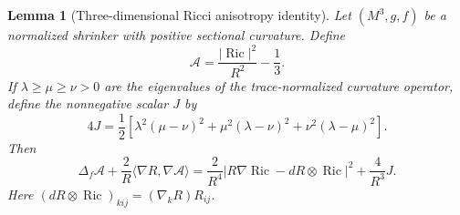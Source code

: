 \documentclass[10pt]{coll-l}
\newtheorem{lemma}[theorem]{Lemma}
\theoremstyle{definition}
\theoremstyle{remark}
\numberwithin{section}{chapter}
\numberwithin{equation}{chapter}
\newcommand{\Ric}{\operatorname{Ric}}
\begin{document}
\begin{lemma}[Three-dimensional Ricci anisotropy identity]
\label{lem:three-shrinker-anisotropy-identity}
Let $(M^3,g,f)$ be a normalized shrinker with positive sectional curvature.
Define
\begin{equation}
             \mathcal A=\frac{|\Ric|^2}{R^2}-\frac13.    \label{eq:three-shrinker-anisotropy}
\end{equation}
If $\lambda\geq\mu\geq\nu>0$ are the eigenvalues of the trace-normalized
curvature operator, define the nonnegative scalar $J$ by
\begin{equation}
 4J=\frac12\left[
       \lambda^2(\mu-\nu)^2
      +\mu^2(\lambda-\nu)^2
      +\nu^2(\lambda-\mu)^2
     \right].                                            \label{eq:three-shrinker-J-squares}
\end{equation}
Then
\begin{equation}
 \Delta_f\mathcal A+\frac{2}{R}\langle\nabla R,\nabla\mathcal A\rangle
  =\frac2{R^4}|R\nabla\Ric-dR\otimes\Ric|^2
     +\frac4{R^3}J.                                      \label{eq:three-shrinker-anisotropy-elliptic}
\end{equation}
Here $(dR\otimes\Ric)_{kij}=(\nabla_kR)R_{ij}$.
\end{lemma}
\end{document}
